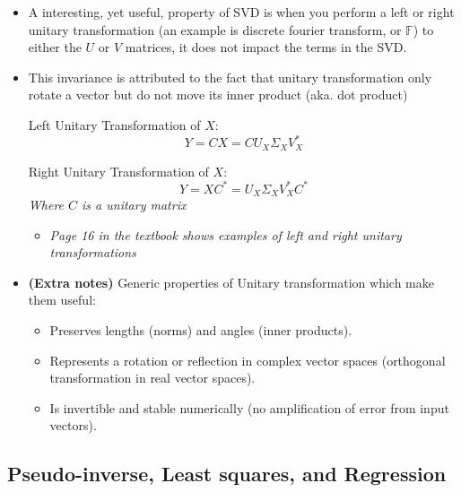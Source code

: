 \documentclass[11.5pt,a4paper]{article}
\begin{document}
\begin{itemize}
    \item A interesting, yet useful, property of SVD is when you perform a left or right unitary transformation (an example is discrete fourier transform, or $\mathbb{F}$) to either the $U$ or $V$ matrices, it does not impact the terms in the SVD.
    \item This invariance is attributed to the fact that unitary transformation only rotate a vector but do not move its inner product (aka. dot product)

    Left Unitary Transformation of $X$:
    \begin{equation*}
        Y = CX = CU_X\Sigma_XV_X^*
    \end{equation*}

    Right Unitary Transformation of $X$:
    \begin{equation*}
        Y = XC^* = U_X\Sigma_XV_X^*C^*
    \end{equation*}
    \textit{Where $C$ is a unitary matrix}
    \begin{itemize}
        \item \textit{Page 16 in the textbook shows examples of left and right unitary transformations}
    \end{itemize}
    \item \textbf{(Extra notes)} Generic properties of Unitary transformation which make them useful:
    \begin{itemize}
        \item Preserves lengths (norms) and angles (inner products).
        \item Represents a rotation or reflection in complex vector spaces (orthogonal transformation in real vector spaces).
        \item Is invertible and stable numerically (no amplification of error from input vectors).
    \end{itemize}
\end{itemize}

\subsection*{Pseudo-inverse, Least squares, and Regression}
\end{document}

